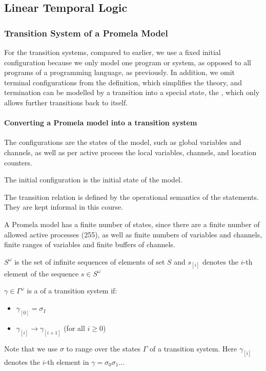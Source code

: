 \newpage
\subsection{Linear Temporal Logic}
\label{sec:ltl}
\subsubsection{Transition System of a Promela Model}
For the transition systems, compared to earlier, we use a fixed initial configuration because we only model one program or system,
as opposed to all programs of a programming language, as previously.
In addition, we omit terminal configurations from the definition, which simplifies the theory, and termination can be modelled by a transition into a special state,
the , which only allows further transitions back to itself.


\paragraph{Converting a Promela model into a transition system}

The configurations are the states of the model, such as global variables and channels, as well as per active process the local variables, channels, and location counters.

The initial configuration is the initial state of the model.

The transition relation is defined by the operational semantics of the statements. They are kept informal in this course.

A Promela model has a finite number of states, since there are a finite number of allowed active processes (255), as well as finite numbers of variables and channels,
finite ranges of variables and finite buffers of channels.



$S^\omega$ is the set of infinite sequences of elements of set $S$ and $s_{[i]}$ denotes the $i$-th element of the sequence $s \in S^\omega$

$\gamma \in \Gamma^\omega$ is a  of a transition system if:
\begin{itemize}
    \item $\gamma_{[0]} = \sigma_I$
    \item $\gamma_{[i]} \rightarrow \gamma_{[i + 1]}$ (for all $i \geq 0$)
\end{itemize}
Note that we use $\sigma$ to range over the states $\Gamma$ of a transition system. Here $\gamma_{[i]}$ denotes the $i$-th element in $\gamma = \sigma_0 \sigma_1 \ldots$

